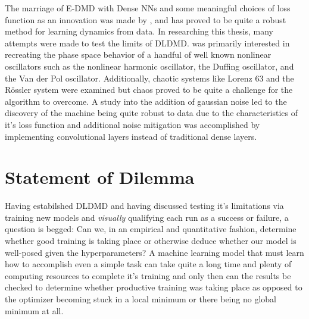 The marriage of E-DMD with Dense NNs and some meaningful choices of loss function as 
an innovation was made by \cite{lago, brunton, lusch}, and has proved to be quite a 
robust method for learning dynamics from data. In researching this thesis, many attempts 
were made to test the limits of DLDMD. \cite{lago} was primarily interested in recreating 
the phase space behavior of a handful of well known nonlinear oscillators such as the 
nonlinear harmonic oscillator, the Duffing oscillator, and the Van der Pol oscillator. 
Additionally, chaotic systems like Lorenz 63 and the R\"{o}ssler system were examined but 
chaos proved to be quite a challenge for the algorithm to overcome. A study into the addition
of gaussian noise led to the discovery of the machine being quite robust to data due to the 
characteristics of it's loss function and additional noise mitigation was accomplished by 
implementing convolutional layers instead of traditional dense layers.

\section{Statement of Dilemma}
Having estabilshed DLDMD and having discussed testing it's limitations via training 
new models and \emph{visually} qualifying each run as a success or failure, a question is 
begged: Can we, in an empirical and quantitative fashion, determine whether good training 
is taking place or otherwise deduce whether our model is well-posed given the 
hyperparameters?
A machine learning model that must learn how to accomplish even a simple task can take 
quite a long time and plenty of computing resources to complete it's training and only then 
can the results be checked to determine whether productive training was taking place as 
opposed to the optimizer becoming stuck in a local minimum or there being no global 
minimum at all.

